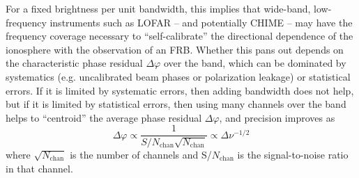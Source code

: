 For a fixed brightness per unit bandwidth, this implies that wide-band, low-frequency instruments such as LOFAR -- and potentially CHIME -- may have the frequency coverage necessary to ``self-calibrate'' the directional dependence of the ionosphere with the observation of an FRB. Whether this pans out depends on the characteristic phase residual $\Delta \varphi$ over the band, which can be dominated by systematics (e.g. uncalibrated beam phases or polarization leakage) or statistical errors. If it is limited by systematic errors, then adding bandwidth does not help, but if it is limited by statistical errors, then using many channels over the band helps to ``centroid'' the average phase residual $\Delta \varphi$, and precision improves as
\begin{equation}
    \Delta\varphi \propto \dfrac{1}{S/N_\mathrm{chan} \sqrt{N_\mathrm{chan}}} \propto \Delta \nu^{-1/2}
\end{equation}
where $\sqrt{N_\mathrm{chan}}$ is the number of channels and S/$N_\mathrm{chan}$ is the signal-to-noise ratio in that channel.
